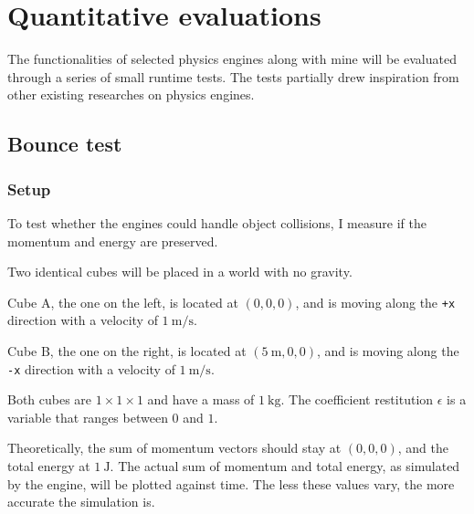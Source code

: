 \documentclass[12pt,a4paper,twoside,openright]{report}
\newcommand{\code}{\texttt}
\begin{document}
\section{Quantitative evaluations} \label{explbl}

The functionalities of selected physics engines along with mine will be evaluated through a series of small runtime tests.
The tests partially drew inspiration from other existing researches on physics engines\cite{seugling2006evaluation}.

\subsection{Bounce test}

\subsubsection{Setup}

To test whether the engines could handle object collisions, I measure if the momentum and energy are preserved.

Two identical cubes will be placed in a world with no gravity. 

Cube A, the one on the left, is located at $(0, 0, 0)$, and is moving along the \code{+x} direction with a velocity of $\SI{1}{\m\per\s}$.

Cube B, the one on the right, is located at $(\SI{5}{\m}, 0, 0)$, and is moving along the \code{-x} direction with a velocity of $\SI{1}{\m\per\s}$.

Both cubes are $1\times 1\times 1$ and have a mass of $\SI{1}{\kg}$. The coefficient restitution $\epsilon$ is a variable that ranges between $0$ and $1$.

\begin{center}
\end{center}

Theoretically, the sum of momentum vectors should stay at $(0, 0, 0)$, and the total energy at $\SI{1}{\J}$.
The actual sum of momentum and total energy, as simulated by the engine, will be plotted against time.
The less these values vary, the more accurate the simulation is.
\end{document}
